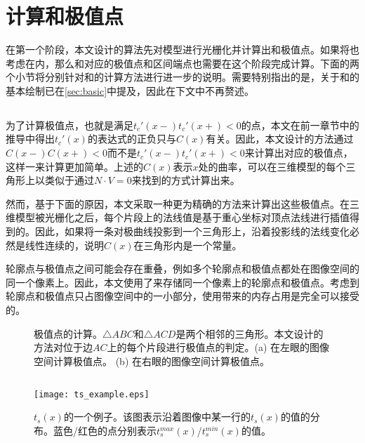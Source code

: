 {\section{计算\conp{}和极值点}

在第一个阶段，本文设计的算法先对模型进行光栅化并计算出\conp{}和极值点。如果将\scon{}也考虑在内，那么\scon{}和对应的极值点和区间端点也需要在这个阶段完成计算。下面的两个小节将分别针对\con{}和\scon{}的计算方法进行进一步的说明。需要特别指出的是，关于\con{}和\scon{}的基本绘制已在\autoref{sec:basic}中提及，因此在下文中不再赘述。

\subsection{\con{}}

为了计算极值点，也就是满足$t_c'(x-)t_c'(x+) < 0$的点，本文在前一章节中的推导中得出$t_c'(x)$的表达式的正负只与$C(x)$有关。因此，本文设计的方法通过$C(x-)C(x+) < 0$而不是$t_c'(x-)t_c'(x+) < 0$来计算出\con{}对应的极值点，这样一来计算更加简单。上述的$C(x)$表示$x$处的曲率，可以在三维模型的每个三角形上以类似于通过$N\cdot{V} = 0$来找到\conp{}的方式计算出来。

然而，基于下面的原因，本文采取一种更为精确的方法来计算出这些极值点。在三维模型被光栅化之后，每个片段上的法线值是基于重心坐标对顶点法线进行插值得到的。因此，如果将一条对极曲线投影到一个三角形上，沿着投影线的法线变化必然是线性连续的，说明$C(x)$在三角形内是一个常量。

轮廓点与极值点之间可能会存在重叠，例如多个轮廓点和极值点都处在图像空间的同一个像素上。因此，本文使用了\ppll{}来存储同一个像素上的轮廓点和极值点。考虑到轮廓点和极值点只占图像空间中的一小部分，使用\ppll{}带来的内存占用是完全可以接受的。

\begin{figure}[tbh]
    \centering
    \hfil
    \caption{极值点的计算。$\triangle ABC$和$\triangle ACD$是两个相邻的三角形。本文设计的方法对位于边$AC$上的每个片段进行极值点的判定。(a) 在左眼的图像空间计算极值点。 (b) 在右眼的图像空间计算极值点。} \label{fig:extreme points}
\end{figure}

\subsection{\scon{}}

\begin{figure}[tbh]
    \centering
    \texttt{[image: ts\_example.eps]}
    \caption{\label{fig:continuity_example}
    $t_s(x)$的一个例子。该图表示沿着图像中某一行的$t_s(x)$的值的分布。蓝色/红色的点分别表示$t_s^{max}(x)$/$t_s^{min}(x)$的值。}
\end{figure}

}
